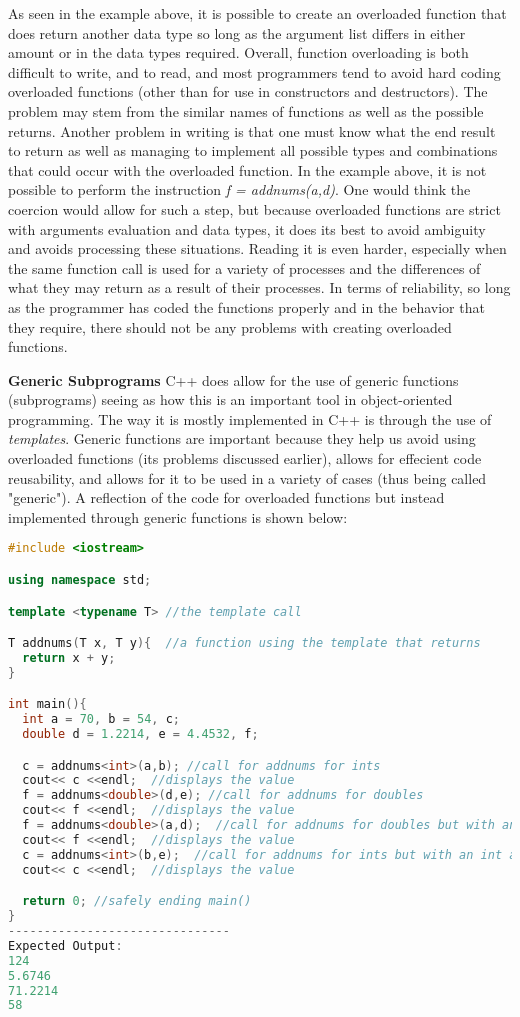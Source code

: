 \documentclass[12pt]{article}
\begin{document}
As seen in the example above, it is possible to create an overloaded function that does return another data type so long as the argument list differs in either amount or in the data types required. Overall, function overloading is both difficult to write, and to read, and most programmers tend to avoid hard coding overloaded functions (other than for use in constructors and destructors). The problem may stem from the similar names of functions as well as the possible returns. Another problem in writing is that one must know what the end result to return as well as managing to implement all possible types and combinations that could occur with the overloaded function. In the example above, it is not possible to perform the instruction \textit{f = addnums(a,d)}. One would think the coercion would allow for such a step, but because overloaded functions are strict with arguments evaluation and data types, it does its best to avoid ambiguity and avoids processing these situations. Reading it is even harder, especially when the same function call is used for a variety of processes and the differences of what they may return as a result of their processes. In terms of reliability, so long as the programmer has coded the functions properly and in the behavior that they require, there should not be any problems with creating overloaded functions.

\textbf{Generic Subprograms} C++ does allow for the use of generic functions (subprograms) seeing as how this is an important tool in object-oriented programming. The way it is mostly implemented in C++ is through the use of \textit{templates}. Generic functions are important because they help us avoid using overloaded functions (its problems discussed earlier), allows for effecient code reusability, and allows for it to be used in a variety of cases (thus being called "generic"). A reflection of the code for overloaded functions but instead implemented through generic functions is shown below:
\begin{lstlisting}[language=C++]
#include <iostream>

using namespace std;

template <typename T> //the template call

T addnums(T x, T y){  //a function using the template that returns 
  return x + y;
}

int main(){
  int a = 70, b = 54, c;
  double d = 1.2214, e = 4.4532, f;

  c = addnums<int>(a,b); //call for addnums for ints
  cout<< c <<endl;  //displays the value
  f = addnums<double>(d,e); //call for addnums for doubles
  cout<< f <<endl;  //displays the value
  f = addnums<double>(a,d);  //call for addnums for doubles but with an int and a double
  cout<< f <<endl;  //displays the value
  c = addnums<int>(b,e);  //call for addnums for ints but with an int and a double
  cout<< c <<endl;  //displays the value

  return 0; //safely ending main()
}
-------------------------------
Expected Output:
124
5.6746
71.2214
58
\end{lstlisting}
\end{document}
